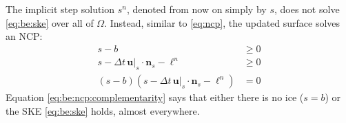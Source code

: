 \documentclass[hidelinks,onefignum,onetabnum,final]{siamart220329}  %
\newcommand{\bn}{\mathbf{n}}
\newcommand{\bu}{\mathbf{u}}
\begin{document}
The implicit step solution $s^n$, denoted from now on simply by $s$, does not solve \eqref{eq:be:ske} over all of $\Omega$.  Instead, similar to \eqref{eq:ncp}, the updated surface solves an NCP:
\begin{subequations}
\label{eq:be:ncp}
\begin{align}
s - b &\ge 0 \label{eq:be:ncp:constraint} \\
s - \Delta t\,\bu|_s \cdot \bn_s - \ell^n &\ge 0 \\
(s - b) \left(s - \Delta t\,\bu|_s \cdot \bn_s - \ell^n\right) &= 0 \label{eq:be:ncp:complementarity}
\end{align}
\end{subequations}
Equation \eqref{eq:be:ncp:complementarity} says that either there is no ice ($s=b$) or the SKE \eqref{eq:be:ske} holds, almost everywhere.
\end{document}
